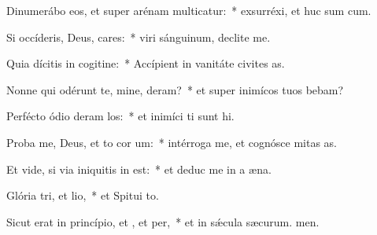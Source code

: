 \item Dinumerábo eos, et super arénam multicatur:~* exsurréxi, et huc sum cum.
\item Si occíderis, Deus, cares:~* viri sánguinum, declite  me.
\item Quia dícitis in cogitine:~* Accípient in vanitáte civites as.
\item Nonne qui odérunt te, mine, deram?~* et super inimícos tuos bebam?
\item Perfécto ódio deram los:~* et inimíci ti sunt hi.
\item Proba me, Deus, et to cor um:~* intérroga me, et cognósce mitas as.
\item Et vide, si via iniquitis in  est:~* et deduc me in a æna.
\item Glória tri, et lio,~* et Spitui to.
\item Sicut erat in princípio, et , et per,~* et in sǽcula sæcurum. men.
